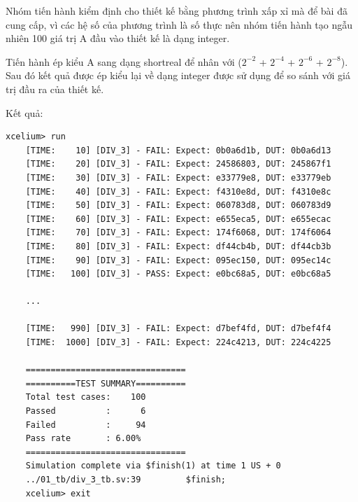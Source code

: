 
 

Nhóm tiến hành kiểm định cho thiết kế bằng phương trình xấp xỉ mà để bài đã cung cấp, vì các hệ số của phương trình là số thực nên nhóm tiến hành tạo ngẫu nhiên 100 giá trị A đầu vào thiết kế là dạng integer. 

Tiến hành ép kiểu A sang dạng shortreal để nhân với ($2^{-2}$ + $2^{-4}$ + $2^{-6}$ + $2^{-8}$).
Sau đó kết quả được ép kiểu lại về dạng integer được sử dụng để so sánh với giá trị đầu ra của thiết kế.



Kết quả:

\begin{lstlisting}[style=StyleResult, language=Result, caption={Kết quả kiểm định cho bộ xấp xỉ chia 3.}]
	xcelium> run
	[TIME:    10] [DIV_3] - FAIL: Expect: 0b0a6d1b, DUT: 0b0a6d13 
	[TIME:    20] [DIV_3] - FAIL: Expect: 24586803, DUT: 245867f1 
	[TIME:    30] [DIV_3] - FAIL: Expect: e33779e8, DUT: e33779eb 
	[TIME:    40] [DIV_3] - FAIL: Expect: f4310e8d, DUT: f4310e8c 
	[TIME:    50] [DIV_3] - FAIL: Expect: 060783d8, DUT: 060783d9 
	[TIME:    60] [DIV_3] - FAIL: Expect: e655eca5, DUT: e655ecac 
	[TIME:    70] [DIV_3] - FAIL: Expect: 174f6068, DUT: 174f6064 
	[TIME:    80] [DIV_3] - FAIL: Expect: df44cb4b, DUT: df44cb3b 
	[TIME:    90] [DIV_3] - FAIL: Expect: 095ec150, DUT: 095ec14c 
	[TIME:   100] [DIV_3] - PASS: Expect: e0bc68a5, DUT: e0bc68a5 
	
	...
	
	[TIME:   990] [DIV_3] - FAIL: Expect: d7bef4fd, DUT: d7bef4f4 
	[TIME:  1000] [DIV_3] - FAIL: Expect: 224c4213, DUT: 224c4225 
	
	================================
	==========TEST SUMMARY==========
	Total test cases:    100    
	Passed          :      6    
	Failed          :     94    
	Pass rate       : 6.00%
	================================
	Simulation complete via $finish(1) at time 1 US + 0
	../01_tb/div_3_tb.sv:39         $finish;
	xcelium> exit
	
\end{lstlisting}

